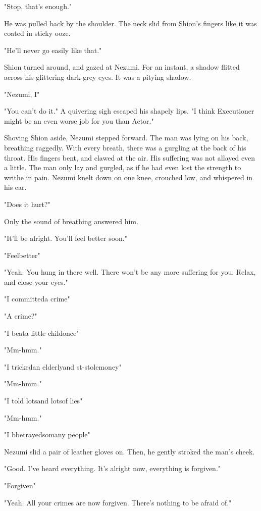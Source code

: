 "Stop, that's enough."

He was pulled back by the shoulder. The neck slid from Shion's fingers
like it was coated in sticky ooze.

"He'll never go easily like that."

Shion turned around, and gazed at Nezumi. For an instant, a shadow
flitted across his glittering dark-grey eyes. It was a pitying shadow.

"Nezumi, I\el "

"You can't do it." A quivering sigh escaped his shapely lips. "I think
Executioner might be an even worse job for you than Actor."

Shoving Shion aside, Nezumi stepped forward. The man was lying on his
back, breathing raggedly. With every breath, there was a gurgling at the
back of his throat. His fingers bent, and clawed at the air. His
suffering was not allayed even a little. The man only lay and gurgled,
as if he had even lost the strength to writhe in pain. Nezumi knelt down
on one knee, crouched low, and whispered in his ear.

"Does it hurt?"

Only the sound of breathing answered him.

"It'll be alright. You'll feel better soon."

"Feel\el better\el "

"Yeah. You hung in there well. There won't be any more suffering for
you. Relax, and close your eyes."

"I committed\el a crime\el "

"A crime?"

"I beat\el a little child\el once\el "

"Mm-hmm."

"I tricked\el an elderly\el and st-stole\el money\el "

"Mm-hmm."

"I told lots\el and lots\el of lies\el "

"Mm-hmm."

"I b\el betrayed\el so\el many people\el "

Nezumi slid a pair of leather gloves on. Then, he gently stroked the
man's cheek.

"Good. I've heard everything. It's alright now, everything is forgiven."

"For\el given\el "

"Yeah. All your crimes are now forgiven. There's nothing to be afraid
of."

